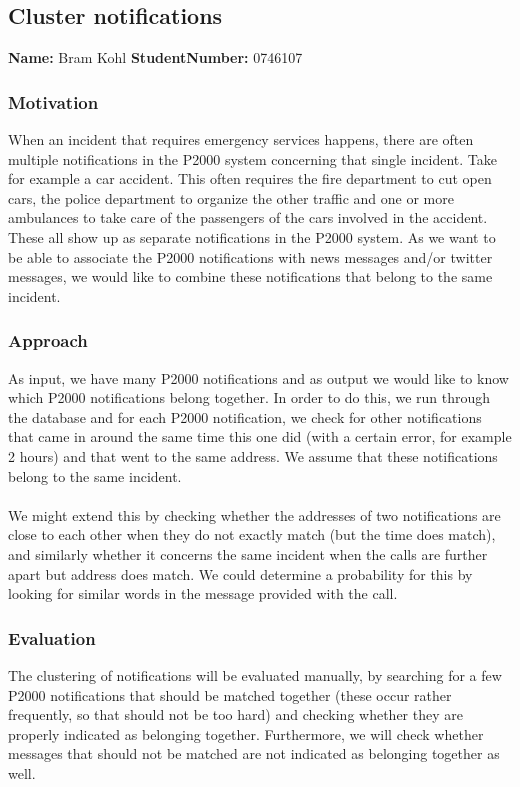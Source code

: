 \subsection{Cluster notifications}
\textbf{Name:} Bram Kohl \indent \textbf{StudentNumber:} 0746107

\subsubsection*{Motivation}
When an incident that requires emergency services happens, there are often multiple notifications in the P2000 system concerning that single incident. Take for example a car accident. This often requires the fire department to cut open cars, the police department to organize the other traffic and one or more ambulances to take care of the passengers of the cars involved in the accident. These all show up as separate notifications in the P2000 system. As we want to be able to associate the P2000 notifications with news messages and/or twitter messages, we would like to combine these notifications that belong to the same incident.
\subsubsection*{Approach}
As input, we have many P2000 notifications and as output we would like to know which P2000 notifications belong together. In order to do this, we run through the database and for each P2000 notification, we check for other notifications that came in around the same time this one did (with a certain error, for example 2 hours) and that went to the same address. We assume that these notifications belong to the same incident.\\\\
We might extend this by checking whether the addresses of two notifications are close to each other when they do not exactly match (but the time does match), and similarly whether it concerns the same incident when the calls are further apart but address does match. We could determine a probability for this by looking for similar words in the message provided with the call.
\subsubsection*{Evaluation}
The clustering of notifications will be evaluated manually, by searching for a few P2000 notifications that should be matched together (these occur rather frequently, so that should not be too hard) and checking whether they are properly indicated as belonging together. Furthermore, we will check whether messages that should not be matched are not indicated as belonging together as well.